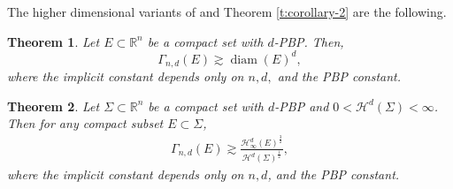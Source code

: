\documentclass[11pt,reqno]{amsart}
\DeclareMathOperator{\diam}{diam}
\newtheorem{theorem}{Theorem}[section]
\theoremstyle{definition}
\theoremstyle{remark}
\numberwithin{equation}{section}
\newcommand{\R}{\mathbb{R}}
\newcommand{\hd}{\mathcal{H}^d}
\newcommand{\hdc}{\mathcal{H}^d_\infty}
\theoremstyle{theorem}
\theoremstyle{definition}
\theoremstyle{remark}
\numberwithin{equation}{section}
\begin{document}
	The higher dimensional variants of  and Theorem \ref{t:corollary-2} are the following.
	\begin{theorem}\label{thm:main higher dim}
		Let $E\subset\R^n$ be a compact set with $d$-PBP. Then,
		\begin{equation}\label{eq:main higher dim}
		\Gamma_{n,d}(E)\gtrsim \diam(E)^d,
		\end{equation}
		where the implicit constant depends only on $n,d,$ and the PBP constant.
	\end{theorem}

\begin{theorem}\label{t:corollary-2b}
	Let $\Sigma\subset \R^n$ be a compact set with $d$-PBP and $0<\hd(\Sigma)<\infty$. Then for any compact subset $E \subset \Sigma$, 
	\begin{align*}
	\Gamma_{n,d}(E) \gtrsim \frac{\hdc(E)^{\frac{3}{2}}}{\hd(\Sigma)^{\frac{1}{2}}},
	\end{align*}
	where the implicit constant depends only on $n,d$, and the PBP constant.
\end{theorem}
\end{document}
